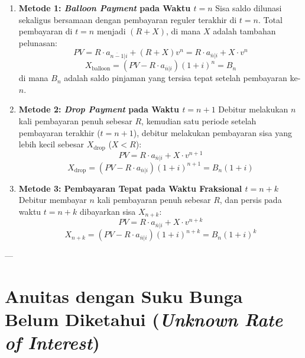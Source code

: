\documentclass[11pt,a4paper]{article}
\begin{document}
\begin{enumerate}[label=\textbf{(\alph*)}]
    \item \textbf{Metode 1: \textit{Balloon Payment} pada Waktu $t = n$}
    Sisa saldo dilunasi sekaligus bersamaan dengan pembayaran reguler terakhir di $t = n$. 
    Total pembayaran di $t = n$ menjadi $(R + X)$, di mana $X$ adalah tambahan pelunasan:
    \begin{equation}
        PV = R \cdot a_{\overline{n-1}|i} + (R + X) v^n = R \cdot a_{\overline{n}|i} + X \cdot v^n
    \end{equation}
    \begin{equation}
        X_{\text{balloon}} = (PV - R \cdot a_{\overline{n}|i})(1+i)^n = B_n
    \end{equation}
    di mana $B_n$ adalah saldo pinjaman yang tersisa tepat setelah pembayaran ke-$n$.

    \item \textbf{Metode 2: \textit{Drop Payment} pada Waktu $t = n + 1$}
    Debitur melakukan $n$ kali pembayaran penuh sebesar $R$, kemudian satu periode setelah pembayaran terakhir ($t = n + 1$), debitur melakukan pembayaran sisa yang lebih kecil sebesar $X_{\text{drop}}$ ($X < R$):
    \begin{equation}
        PV = R \cdot a_{\overline{n}|i} + X \cdot v^{n+1}
    \end{equation}
    \begin{equation}
        X_{\text{drop}} = (PV - R \cdot a_{\overline{n}|i})(1+i)^{n+1} = B_n (1+i)
    \end{equation}

    \item \textbf{Metode 3: Pembayaran Tepat pada Waktu Fraksional $t = n + k$}
    Debitur membayar $n$ kali pembayaran penuh sebesar $R$, dan persis pada waktu $t = n + k$ dibayarkan sisa $X_{n+k}$:
    \begin{equation}
        PV = R \cdot a_{\overline{n}|i} + X \cdot v^{n+k}
    \end{equation}
    \begin{equation}
        X_{n+k} = (PV - R \cdot a_{\overline{n}|i})(1+i)^{n+k} = B_n (1+i)^k
    \end{equation}
\end{enumerate}

---

\section{Anuitas dengan Suku Bunga Belum Diketahui (\textit{Unknown Rate of Interest})}
\end{document}
